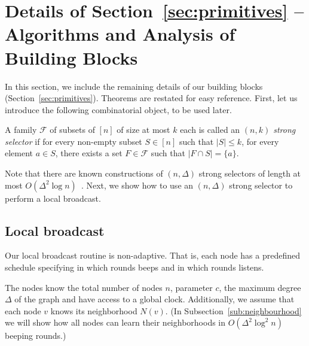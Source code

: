 \section{Details of Section~\ref{sec:primitives} -- Algorithms and Analysis of Building Blocks}
\label{sec:prim_details}

In this section, we include the remaining details of our building blocks (Section~\ref{sec:primitives}). Theorems are restated for easy reference. First, let us introduce the following combinatorial object, to be used later.

\begin{definition}
\label{def:strong-selector}
    A family $\mathcal{F}$ of subsets of $[n]$ of size at most $k$ each is called an \emph{$(n,k)$ strong selector} if for every non-empty subset $S \in [n]$ such that $|S| \leq k$, for every element $a \in S$, there exists a set $F \in \mathcal{F}$ such that $|F \cap S| = \{a\}$.
\end{definition}

Note that there are known constructions of $(n,\Delta)$ strong selectors of length at most $O(\Delta^2 \log n)$~\cite{5967914}. Next, we show how to use an $(n,\Delta)$ strong selector to perform a local broadcast.

\subsection{Local broadcast}
\label{sec:local-broadcast}

Our local broadcast routine is non-adaptive. That is, each node 
has a predefined schedule 
specifying in which rounds beeps and in which rounds listens. 

The nodes know the total number of nodes $n$, parameter $c$,
the maximum degree $\Delta$ of the graph and have access to a global clock. Additionally, we assume that each node $v$ knows its neighborhood $N(v)$. (In Subsection~\ref{sub:neighbourhood} we will show how all nodes can learn their neighborhoods in $O(\Delta^2 \log^2 n)$ beeping rounds.)

\localbroadcastthm*
{}

